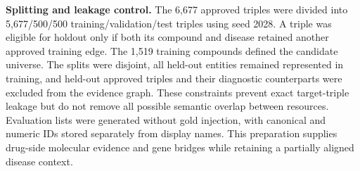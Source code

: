 \begin{revisionblock}
\textbf{Splitting and leakage control.}
The 6,677 approved triples were divided into 5,677/500/500 training/validation/test triples using seed 2028. A triple was eligible for holdout only if both its compound and disease retained another approved training edge. The 1,519 training compounds defined the candidate universe. The splits were disjoint, all held-out entities remained represented in training, and held-out approved triples and their diagnostic counterparts were excluded from the evidence graph. These constraints prevent exact target-triple leakage but do not remove all possible semantic overlap between resources. Evaluation lists were generated without gold injection, with canonical and numeric IDs stored separately from display names. This preparation supplies drug-side molecular evidence and gene bridges while retaining a partially aligned disease context.
\end{revisionblock}
